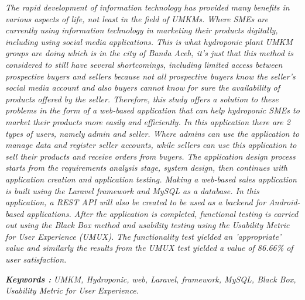 \begin{abstracteng}
\textit{The rapid development of information technology has provided many benefits in various aspects of life, not least in the field of UMKMs. Where SMEs are currently using information technology in marketing their products digitally, including using social media applications. This is what hydroponic plant UMKM groups are doing which is in the city of Banda Aceh, it's just that this method is considered to still have several shortcomings, including limited access between prospective buyers and sellers because not all prospective buyers know the seller's social media account and also buyers cannot know for sure the availability of products offered by the seller. Therefore, this study offers a solution to these problems in the form of a web-based application that can help hydroponic SMEs to market their products more easily and efficiently. In this application there are 2 types of users, namely admin and seller. Where admins can use the application to manage data and register seller accounts, while sellers can use this application to sell their products and receive orders from buyers. The application design process starts from the requirements analysis stage, system design, then continues with application creation and application testing. Making a web-based sales application is built using the Laravel framework and MySQL as a database. In this application, a REST API will also be created to be used as a backend for Android-based applications. After the application is completed, functional testing is carried out using the Black Box method and usability testing using the Usability Metric for User Experience (UMUX). The functionality test yielded an 'appropriate' value and similarly the results from the UMUX test yielded a value of 86.66\% of user satisfaction.}

\bigskip
\noindent
\textbf{\emph{Keywords :}} \textit{UMKM, Hydroponic, web, Laravel, framework, MySQL, Black Box, Usability Metric for User Experience.}
\end{abstracteng}